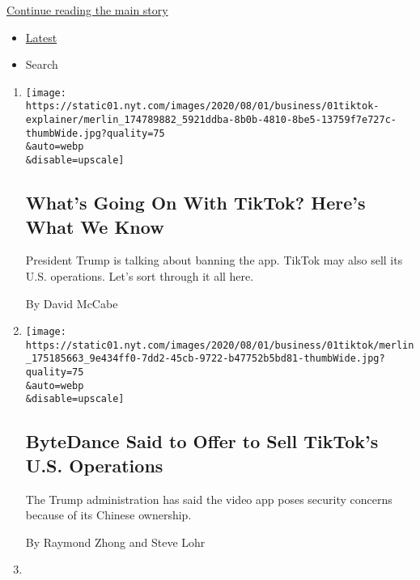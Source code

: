 \protect\hyperlink{after-mid1}{Continue reading the main story}

\begin{itemize}
\tightlist
\item
  \protect\hyperlink{stream-panel}{Latest}
\item
  Search
\end{itemize}

\begin{enumerate}
\def\labelenumi{\arabic{enumi}.}
\item
  \href{/2020/08/01/technology/tiktok-trump-microsoft-bytedance-china-ban.html}{}

  \texttt{[image: https://static01.nyt.com/images/2020/08/01/business/01tiktok-explainer/merlin\_174789882\_5921ddba-8b0b-4810-8be5-13759f7e727c-thumbWide.jpg?quality=75\\\&auto=webp\\\&disable=upscale]}

  \hypertarget{whats-going-on-with-tiktok-heres-what-we-know}{%
  \subsection{What's Going On With TikTok? Here's What We
  Know}\label{whats-going-on-with-tiktok-heres-what-we-know}}

  President Trump is talking about banning the app. TikTok may also sell
  its U.S. operations. Let's sort through it all here.

  By David McCabe
\item
  \href{/2020/08/01/technology/tiktok-sale-trump-ban.html}{}

  \texttt{[image: https://static01.nyt.com/images/2020/08/01/business/01tiktok/merlin\_175185663\_9e434ff0-7dd2-45cb-9722-b47752b5bd81-thumbWide.jpg?quality=75\\\&auto=webp\\\&disable=upscale]}

  \hypertarget{bytedance-said-to-offer-to-sell-tiktoks-us-operations}{%
  \subsection{ByteDance Said to Offer to Sell TikTok's U.S.
  Operations}\label{bytedance-said-to-offer-to-sell-tiktoks-us-operations}}

  The Trump administration has said the video app poses security
  concerns because of its Chinese ownership.

  By Raymond Zhong and Steve Lohr
\item
  \href{/2020/07/31/business/michael-dell-corner-office.html}{}


\end{enumerate}
